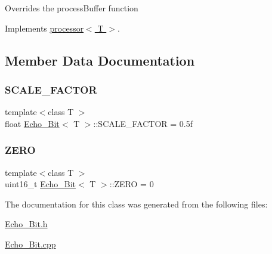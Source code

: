 Overrides the process\+Buffer function 

Implements \hyperlink{classprocessor_ab23d53c7dd927e50108272ee007dcc29}{processor$<$ T $>$}.



\subsection{Member Data Documentation}
\mbox{\label{classEcho__16Bit_af2b0a9612ef321a85fc2a1362720ba94}} 
\subsubsection{\texorpdfstring{S\+C\+A\+L\+E\+\_\+\+F\+A\+C\+T\+OR}{SCALE\_FACTOR}}
{\footnotesize\ttfamily template$<$class T $>$ \\
float \hyperlink{classEcho__16Bit}{Echo\+\_\+Bit}$<$ T $>$\+::S\+C\+A\+L\+E\+\_\+\+F\+A\+C\+T\+OR = 0.\+5f}

\mbox{\label{classEcho__16Bit_a82049f08fac39a845a18d72b5a1fe09c}} 
\subsubsection{\texorpdfstring{Z\+E\+RO}{ZERO}}
{\footnotesize\ttfamily template$<$class T $>$ \\
uint16\+\_\+t \hyperlink{classEcho__16Bit}{Echo\+\_\+Bit}$<$ T $>$\+::Z\+E\+RO = 0}



The documentation for this class was generated from the following files\+:\begin{DoxyCompactItemize}
\item 
\hyperlink{Echo__16Bit_8h}{Echo\+\_\+Bit.\+h}\item 
\hyperlink{Echo__16Bit_8cpp}{Echo\+\_\+Bit.\+cpp}\end{DoxyCompactItemize}
